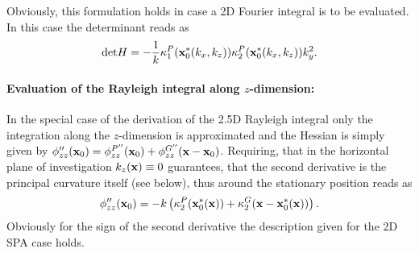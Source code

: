 Obviously, this formulation holds in case a 2D Fourier integral is to be evaluated.
In this case the determinant reads as
\begin{equation}
\mathrm{det} H  = -\frac{1}{k} \kappa_1^P(\mathbf{x}_0^*(k_x,k_z)) \kappa_2^P(\mathbf{x}_0^*(k_x,k_z	)) k_y^2.
\end{equation}


\paragraph{Evaluation of the Rayleigh integral along $z$-dimension:}
In the special case of the derivation of the 2.5D Rayleigh integral only the integration along the $z$-dimension is approximated and the Hessian is simply given by $\phi''_{zz}(\mathbf{x}_0) =\phi^{P''}_{zz}(\mathbf{x}_0) + \phi^{G''}_{zz}(\mathbf{x}-\mathbf{x}_0)$.
Requiring, that in the horizontal plane of investigation $k_z(\mathbf{x}) \equiv 0$ guarantees, that the second derivative is the principal curvature itself (see below), thus around the stationary position reads as
\begin{equation}
\phi''_{zz}(\mathbf{x}_0) = -k \left( \kappa_2^P(\mathbf{x}_0^*(\mathbf{x})) + \kappa_2^G(\mathbf{x}-\mathbf{x}_0^*(\mathbf{x})) \right).
\end{equation}
Obviously for the sign of the second derivative the description given for the 2D SPA case holds.

